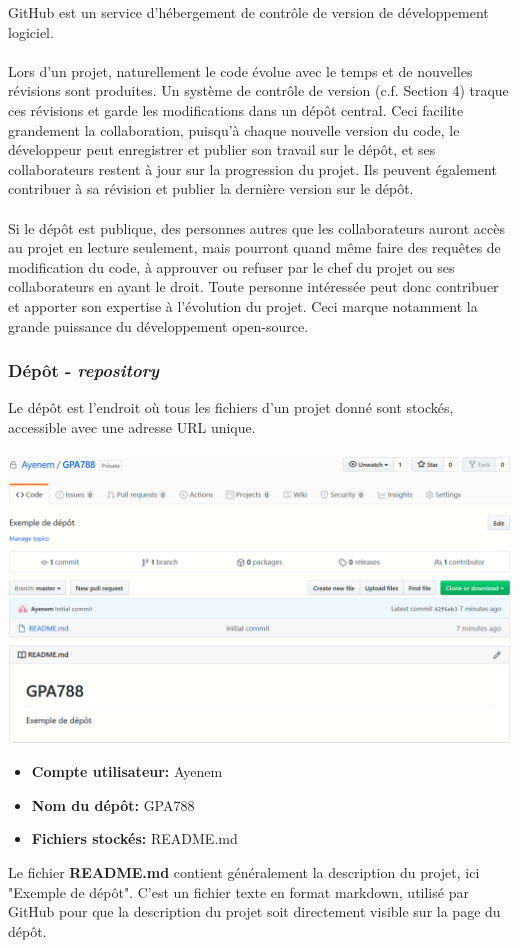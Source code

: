 \documentclass{article}
\begin{document}
GitHub est un service d'hébergement de contrôle de version de développement logiciel.\\\\
Lors d'un projet, naturellement le code évolue avec le temps et de nouvelles révisions sont produites. Un système de contrôle de version (c.f. Section 4) traque ces révisions et garde les modifications dans un dépôt central. Ceci facilite grandement la collaboration, puisqu'à chaque nouvelle version du code, le développeur peut enregistrer et publier son travail sur le dépôt, et ses collaborateurs restent à jour sur la progression du projet. Ils peuvent également contribuer à sa révision et publier la dernière version sur le dépôt.\\\\
Si le dépôt est publique, des personnes autres que les collaborateurs auront accès au projet en lecture seulement, mais pourront quand même faire des requêtes de modification du code, à approuver ou refuser par le chef du projet ou ses collaborateurs en ayant le droit. Toute personne intéressée peut donc contribuer et apporter son expertise à l'évolution du projet. Ceci marque notamment la grande puissance du développement open-source.

\subsubsection{Dépôt - \textit{repository}}
Le dépôt est l'endroit où tous les fichiers d'un projet donné sont stockés, accessible avec une adresse URL unique.\\\\
\includegraphics[width=1\textwidth, center]{Repo}
\begin{itemize}
  \item \textbf{Compte utilisateur:} Ayenem
  \item \textbf{Nom du dépôt:} GPA788
  \item \textbf{Fichiers stockés:} README.md
\end{itemize}
Le fichier \textbf{README.md} contient généralement la description du projet, ici "Exemple de dépôt".
C'est un fichier texte en format markdown, utilisé par GitHub pour que la description du projet soit directement visible sur la page du dépôt.
\end{document}
